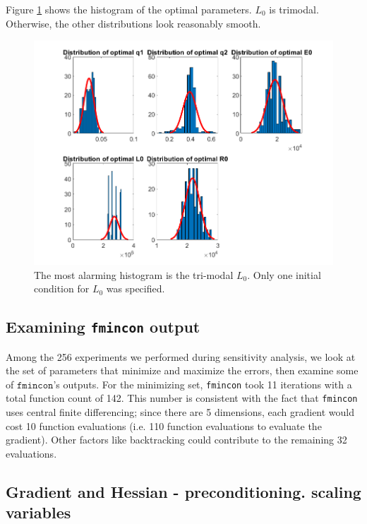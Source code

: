 \documentclass{article}
\begin{document}
Figure \ref{fig:Histo5} shows the histogram of the optimal parameters.  $L_0$ is trimodal.  Otherwise, the other distributions look reasonably smooth.

\begin{figure}
	\centering
	\includegraphics[width=\textwidth]{Optimized parameter distribution across sensitivity analysisRun5}
	
	\caption{The most alarming histogram is the tri-modal $L_0$.  Only one initial condition for $L_0$ was specified.}
	
	\label{fig:Histo5}
\end{figure}

\subsection{Examining \texttt{fmincon} output}

Among the 256 experiments we performed during sensitivity analysis, we look at the set of parameters that minimize and maximize the errors, then examine some of $\texttt{fmincon}$'s outputs.  For the minimizing set, \texttt{fmincon} took 11 iterations with a total function count of 142.  This number is consistent with the fact that \texttt{fmincon} uses central finite differencing; since there are 5 dimensions, each gradient would cost 10 function evaluations (i.e. 110 function evaluations to evaluate the gradient).  Other factors like backtracking could contribute to the remaining 32 evaluations.

\subsection{Gradient and Hessian - preconditioning. scaling variables} 
\end{document}
